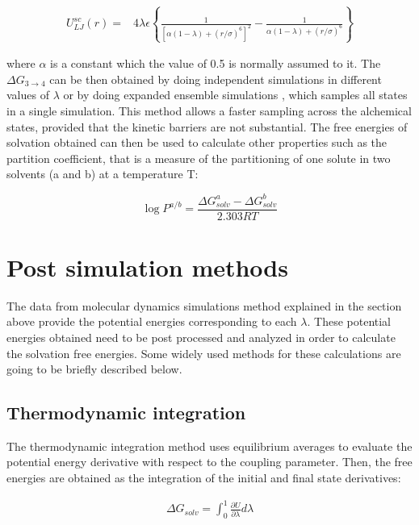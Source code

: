 \begin{equation}
\label{eq:softcoreLJ}
\begin{aligned}
U_{LJ}^{sc}(r) {}=& 4\lambda\epsilon \left\lbrace\frac{1}{\left[\alpha(1-\lambda)+ (r/\sigma)^{6}\right]^{2}} - \frac{1}{\alpha(1-\lambda)+(r/\sigma)^{6}}\right\rbrace
\end{aligned}
\end{equation}

where $\alpha$ is a constant which the value of 0.5 is normally assumed to it. The $\Delta G_{3 \rightarrow 4}$ can be then obtained by doing independent simulations in different values of $\lambda$ or by doing expanded ensemble simulations \cite{lyubartsev}, which samples all states in a single simulation. This method allows a faster sampling across the alchemical states, provided that the kinetic barriers are not substantial. The free energies of solvation obtained can then be used to calculate other properties such as the partition coefficient, that is a measure of the partitioning of one solute in two solvents (a and b) at a temperature T:

\begin{equation}
\label{eqn:partcoe}
\log{P}^{a/b} = \frac{\Delta G_{solv}^{a} - \Delta G_{solv}^{b}}{2.303RT}
\end{equation}

\section{Post simulation methods}

The data from molecular dynamics simulations method explained in the section above provide the potential energies corresponding to each $\lambda$. These potential energies obtained need to be post processed and analyzed in order to calculate the solvation free energies. Some widely used methods for these calculations are going to be briefly described below. 

\subsection{Thermodynamic integration}

The thermodynamic integration method \cite{kirkwood1935} uses equilibrium averages to evaluate the potential energy derivative with respect to the coupling parameter. Then, the free energies are obtained as the integration of the initial and final state derivatives:

\begin{equation}
\label{eq:ti}
\begin{aligned}
\Delta G_{solv} = \int_{0}^{1} \frac{\partial U}{\partial \lambda} d\lambda
\end{aligned}
\end{equation}

